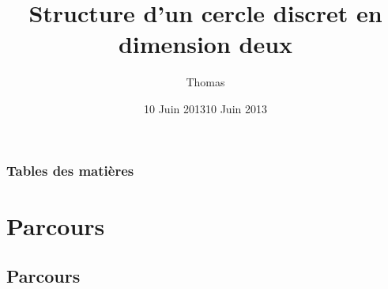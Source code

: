 \documentclass{beamer}
\title[Présentation M2Disco]{Structure d'un cercle discret en dimension deux} %
\author{\bsc{Lafond} Thomas} %
\date{10 Juin 2013}
\institute[LIRIS] %
{
  Laboratoire d'InfoRmatique en Image et Syst\`{e}mes d'information \\ %
  \medskip
  \textit{-- Présentation d'équipe : M2Disco --}\\
  \medskip
  Encadrant : \bsc{Roussillon} Tristan 
}
\date{10 Juin 2013} %
\begin{document}
\begin{frame}
  \titlepage %
\end{frame}

\begin{frame}
  \frametitle{Tables des matières} %
  \setcounter{tocdepth}{1}
  \tableofcontents %
\end{frame}


\section{Parcours} 

\subsection{Parcours}
 
\end{document}
